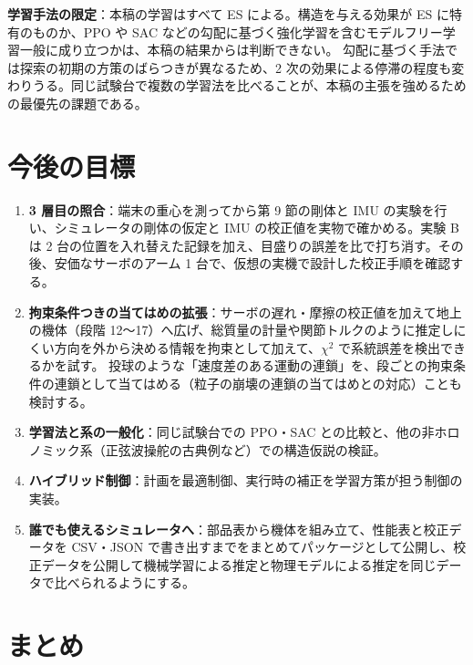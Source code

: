 \documentclass[paper=a4paper,fontsize=10pt,twocolumn,column_gap=2zw,line_length=24zw,number_of_lines=46,head_space=20mm]{jlreq}
\begin{document}
\textbf{学習手法の限定}：本稿の学習はすべて ES による。構造を与える効果が ES に特有のものか、PPO や SAC などの勾配に基づく強化学習を含むモデルフリー学習一般に成り立つかは、本稿の結果からは判断できない。
勾配に基づく手法では探索の初期の方策のばらつきが異なるため、2 次の効果による停滞の程度も変わりうる。同じ試験台で複数の学習法を比べることが、本稿の主張を強めるための最優先の課題である。


\section{今後の目標}

\begin{enumerate}\setlength{\itemsep}{0pt}
\item \textbf{3 層目の照合}：端末の重心を測ってから第 9 節の剛体と IMU の実験を行い、シミュレータの剛体の仮定と IMU の校正値を実物で確かめる。実験 B は 2 台の位置を入れ替えた記録を加え、目盛りの誤差を比で打ち消す。その後、安価なサーボのアーム 1 台で、仮想の実機で設計した校正手順を確認する。
\item \textbf{拘束条件つきの当てはめの拡張}：サーボの遅れ・摩擦の校正値を加えて地上の機体（段階 12〜17）へ広げ、総質量の計量や関節トルクのように推定しにくい方向を外から決める情報を拘束として加えて、$\chi^2$ で系統誤差を検出できるかを試す。
投球のような「速度差のある運動の連鎖」を、段ごとの拘束条件の連鎖として当てはめる（粒子の崩壊の連鎖の当てはめとの対応）ことも検討する。
\item \textbf{学習法と系の一般化}：同じ試験台での PPO・SAC との比較と、他の非ホロノミック系（正弦波操舵の古典例など）での構造仮説の検証。
\item \textbf{ハイブリッド制御}：計画を最適制御、実行時の補正を学習方策が担う制御の実装。
\item \textbf{誰でも使えるシミュレータへ}：部品表から機体を組み立て、性能表と校正データを CSV・JSON で書き出すまでをまとめてパッケージとして公開し、校正データを公開して機械学習による推定と物理モデルによる推定を同じデータで比べられるようにする。
\end{enumerate}


\section{まとめ}
\end{document}
